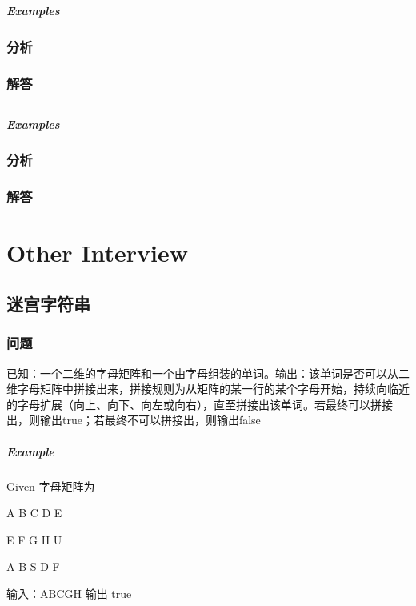 \documentclass[UTF8,a4paper,12pt]{ctexbook}
\begin{document}
	\subsection{}
	
		\subparagraph{Examples}
		
		\subsubsection{分析}
		
		\subsubsection{解答}
	\subsection{}
		
		\subparagraph{Examples}
		
		\subsubsection{分析}
		
		\subsubsection{解答}

\section{Other Interview}
\subsection{迷宫字符串} 
	\subsubsection{问题}
	已知：一个二维的字母矩阵和一个由字母组装的单词。输出：该单词是否可以从二维字母矩阵中拼接出来，拼接规则为从矩阵的某一行的某个字母开始，持续向临近的字母扩展（向上、向下、向左或向右），直至拼接出该单词。若最终可以拼接出，则输出true；若最终不可以拼接出，则输出false
	
	\subparagraph{Example}
		Given 字母矩阵为
		
			A B C D E
			
			E F G H U
			
			A B S D F
		
		输入：ABCGH  输出 true
		
\end{document}
